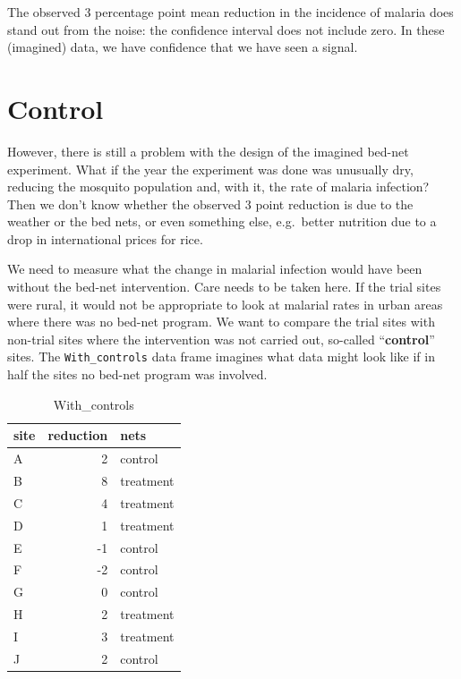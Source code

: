 \documentclass[
  letterpaper,
  DIV=11,
  numbers=noendperiod,
  oneside]{scrreprt}
\begin{document}
{\begin{footnotesize}
The observed 3 percentage point mean reduction in the incidence of
malaria does stand out from the noise: the confidence interval does not
include zero. In these (imagined) data, we have confidence that we have
seen a signal.

\hypertarget{control}{%
\section{Control}\label{control}}

However, there is still a problem with the design of the imagined
bed-net experiment. What if the year the experiment was done was
unusually dry, reducing the mosquito population and, with it, the rate
of malaria infection? Then we don't know whether the observed 3 point
reduction is due to the weather or the bed nets, or even something else,
e.g.~better nutrition due to a drop in international prices for rice.

We need to measure what the change in malarial infection would have been
without the bed-net intervention. Care needs to be taken here. If the
trial sites were rural, it would not be appropriate to look at malarial
rates in urban areas where there was no bed-net program. We want to
compare the trial sites with non-trial sites where the intervention was
not carried out, so-called ``\textbf{control}'' sites. The
\texttt{With\_controls} data frame imagines what data might look like if
in half the sites no bed-net program was involved.

\hypertarget{tbl-bed-net-controls}{}
\ttfamily 
\begin{table}
\caption{\label{tbl-bed-net-controls}With\_controls }\tabularnewline

\centering
\begin{tabular}{lrl}
\toprule
site & reduction & nets\\
\midrule
A & 2 & control\\
B & 8 & treatment\\
C & 4 & treatment\\
D & 1 & treatment\\
E & -1 & control\\
\addlinespace
F & -2 & control\\
G & 0 & control\\
H & 2 & treatment\\
I & 3 & treatment\\
J & 2 & control\\
\bottomrule
\end{tabular}
\end{table}
 \normalfont
\bigskip


\end{footnotesize}}
\end{document}

